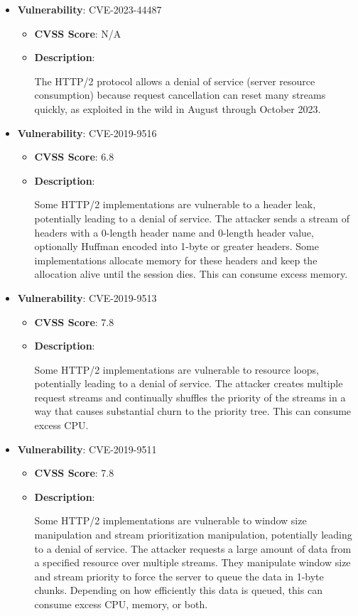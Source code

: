 \documentclass{article}
\begin{document}
\begin{itemize}
        \item \textbf{Vulnerability}: CVE-2023-44487
        \begin{itemize}
            \item \textbf{CVSS Score}:  N/A 
            \item \textbf{Description}:
            \parbox[t]{0.9\linewidth}{
                \ttfamily The HTTP/2 protocol allows a denial of service (server resource consumption) because request cancellation can reset many streams quickly, as exploited in the wild in August through October 2023.
            }
        \end{itemize}
    
        \item \textbf{Vulnerability}: CVE-2019-9516
        \begin{itemize}
            \item \textbf{CVSS Score}:  6.8 
            \item \textbf{Description}:
            \parbox[t]{0.9\linewidth}{
                \ttfamily Some HTTP/2 implementations are vulnerable to a header leak, potentially leading to a denial of service. The attacker sends a stream of headers with a 0-length header name and 0-length header value, optionally Huffman encoded into 1-byte or greater headers. Some implementations allocate memory for these headers and keep the allocation alive until the session dies. This can consume excess memory.
            }
        \end{itemize}
    
        \item \textbf{Vulnerability}: CVE-2019-9513
        \begin{itemize}
            \item \textbf{CVSS Score}:  7.8 
            \item \textbf{Description}:
            \parbox[t]{0.9\linewidth}{
                \ttfamily Some HTTP/2 implementations are vulnerable to resource loops, potentially leading to a denial of service. The attacker creates multiple request streams and continually shuffles the priority of the streams in a way that causes substantial churn to the priority tree. This can consume excess CPU.
            }
        \end{itemize}
    
        \item \textbf{Vulnerability}: CVE-2019-9511
        \begin{itemize}
            \item \textbf{CVSS Score}:  7.8 
            \item \textbf{Description}:
            \parbox[t]{0.9\linewidth}{
                \ttfamily Some HTTP/2 implementations are vulnerable to window size manipulation and stream prioritization manipulation, potentially leading to a denial of service. The attacker requests a large amount of data from a specified resource over multiple streams. They manipulate window size and stream priority to force the server to queue the data in 1-byte chunks. Depending on how efficiently this data is queued, this can consume excess CPU, memory, or both.
            }
        \end{itemize}
    

\end{itemize}
\end{document}
